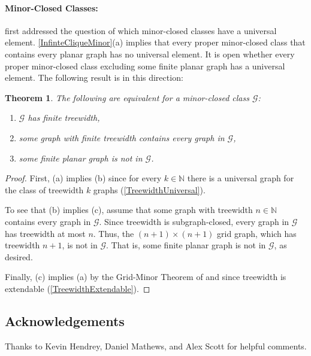 \documentclass[a4paper,11pt]{article}
\theoremstyle{plain}
\newtheorem{thm}{Theorem}[section]
\theoremstyle{definition}
\newcommand{\GG}{\mathcal{G}}
\newcommand{\NN}{\mathbb{N}}
\begin{document}
\paragraph{Minor-Closed Classes:} 
\citet{DHV85} first addressed the question of which minor-closed classes have a universal element. \cref{InfinteCliqueMinor}(a) implies that every proper minor-closed class that contains every planar graph has no universal element. It is open whether every proper minor-closed class excluding some finite planar graph has a universal element. The following result is in this direction:

\begin{thm}
The following are equivalent for a minor-closed class $\GG$:
\begin{enumerate}[label=(\alph*)]
\item $\GG$ has finite treewidth,
\item some graph with finite treewidth contains every graph in $\GG$,
\item some finite planar graph is not in $\GG$.
\end{enumerate}
\end{thm}
\begin{proof}
First, (a) implies (b) since for every $k\in\NN$ there is a universal graph for the class of treewidth $k$ graphs (\cref{TreewidthUniversal}). 

To see that (b) implies (c), assume that some graph with treewidth $n\in\NN$ contains every graph in $\GG$. Since treewidth is subgraph-closed, every graph in $\GG$ has treewidth at most $n$. Thus, the $(n+1)\times (n+1)$ grid graph, which has treewidth $n+1$, is not in $\GG$. That is, some finite planar graph is not in $\GG$, as desired. 

Finally, (c) implies (a) by the Grid-Minor Theorem of \citet{RS-V} and since treewidth is extendable (\cref{TreewidthExtendable}). 
\end{proof}

\subsection*{Acknowledgements} Thanks to Kevin Hendrey, Daniel Mathews, and Alex Scott for helpful comments. 

  \let\oldthebibliography=\thebibliography
  \let\endoldthebibliography=\endthebibliography
  \renewenvironment{thebibliography}[1]{%
    \begin{oldthebibliography}{#1}%
      \setlength{\parskip}{0.2ex}%
      \setlength{\itemsep}{0.2ex}%
  }{\end{oldthebibliography}}
\end{document}
